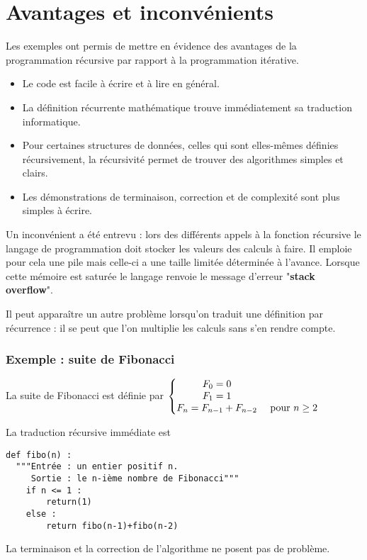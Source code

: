 \section{Avantages et inconvénients}
Les exemples ont permis de mettre en évidence des avantages de la programmation récursive par rapport à la programmation itérative.
\begin{itemize}
\item Le code est facile à écrire et à lire en général.
\item La définition récurrente mathématique trouve immédiatement sa traduction informatique.
\item Pour certaines structures de données, celles qui sont elles-mêmes définies récursivement, la récursivité permet de trouver des algorithmes simples et clairs.
\item Les démonstrations de terminaison, correction et de complexité sont plus simples à écrire.
\end{itemize}
\medskip

Un inconvénient a été entrevu : lors des différents appels à la fonction récursive le langage de programmation doit stocker les valeurs des calculs à faire. Il emploie pour cela une pile mais celle-ci a une taille limitée déterminée à l'avance. Lorsque cette mémoire est saturée le langage renvoie le message d'erreur "{\bf stack overflow}".

\medskip

Il peut apparaître un autre problème lorsqu'on traduit une définition par récurrence : il se peut que l'on multiplie les calculs sans s'en rendre compte.

\subsubsection{Exemple : suite de Fibonacci}

La suite de Fibonacci est définie par $ \left\{\begin{matrix} F_0=0 &\cr  F_1=1 &\cr  F_n = F_{n-1}+F_{n-2}&\hbox{ pour  }n \ge 2\cr \end{matrix}\right.$

La traduction récursive immédiate est  
\begin{lstlisting}
def fibo(n) :
  """Entrée : un entier positif n.
     Sortie : le n-ième nombre de Fibonacci"""
    if n <= 1 :
        return(1)
    else :
        return fibo(n-1)+fibo(n-2) 
\end{lstlisting}
La terminaison et la correction de l'algorithme ne posent pas de problème.

